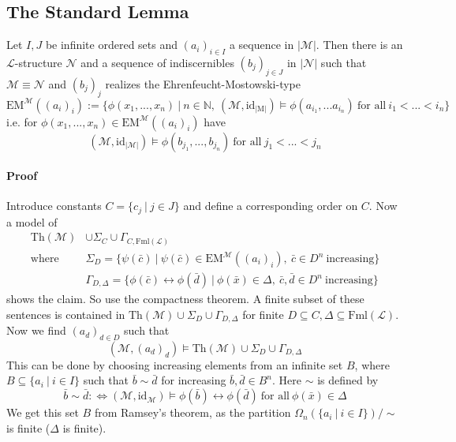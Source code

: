 \documentclass{scrartcl}
\newcommand{\N}{\mathbb{N}}
\begin{document}
\subsection{The Standard Lemma}
Let $I, J$ be infinite ordered sets and $(a_i)_{i \in I}$ a sequence in $|\mathcal{M}|$.
Then there is an $\mathcal{L}$-structure $\mathcal{N}$ and a sequence of indiscernibles $(b_j)_{j \in J}$ in $|\mathcal{N}|$ such that $\mathcal{M} \equiv \mathcal{N}$ and $(b_j)_j$ realizes the Ehrenfeucht-Mostowski-type
\begin{equation*}
    \mathrm{EM}^{\mathcal{M}}((a_i)_i) := \{ \phi(x_1, ..., x_n) \ | \ n \in \N, \ (\mathcal{M}, \mathrm{id}_{|\mathrm{M}|}) \models \phi(a_{i_1}, ... a_{i_n}) \ \text{for all} \ i_1 < ... < i_n \}
\end{equation*}
i.e. for $\phi(x_1, ..., x_n) \in \mathrm{EM}^{\mathcal{M}}((a_i)_i)$ have
\begin{equation*}
    (\mathcal{M}, \mathrm{id}_{|\mathcal{M}|}) \models \phi(b_{j_1}, ..., b_{j_n}) \ \text{for all} \ j_1 < ... < j_n
\end{equation*}
\paragraph{Proof} Introduce constants $C = \{ c_j \ | \ j \in J \}$ and define a corresponding order on $C$.
Now a model of
\begin{align*}
    \mathrm{Th}(\mathcal{M})& \cup \Sigma_C \cup \Gamma_{C, \mathrm{Fml}(\mathcal{L})} \\
    \text{where} \ &\Sigma_D = \{ \psi(\bar{c}) \ | \ \psi(\bar{c}) \in \mathrm{EM}^{\mathcal{M}}((a_i)_i), \ \bar{c} \in D^n \ \text{increasing} \} \\
    &\Gamma_{D, \Delta} = \{ \phi(\bar{c}) \leftrightarrow \phi(\bar{d}) \ | \ \phi(\bar{x}) \in \Delta, \ \bar{c}, \bar{d} \in D^n \ \text{increasing} \}
\end{align*}
shows the claim. So use the compactness theorem. 
A finite subset of these sentences is contained in $\mathrm{Th}(\mathcal{M}) \cup \Sigma_D \cup \Gamma_{D, \Delta}$ for finite $D \subseteq C, \Delta \subseteq \mathrm{Fml}(\mathcal{L})$.
Now we find $(a_d)_{d \in D}$ such that
\begin{equation*}
    (\mathcal{M}, (a_d)_d) \models \mathrm{Th}(\mathcal{M}) \cup \Sigma_D \cup \Gamma_{D, \Delta}
\end{equation*}
This can be done by choosing increasing elements from an infinite set $B$, where $B \subseteq \{ a_i \ | \ i \in I \}$ such that $\bar{b} \sim \bar{d}$ for increasing $\bar{b}, \bar{d} \in B^n$.
Here $\sim$ is defined by
\begin{equation*}
    \bar{b} \sim \bar{d} :\Leftrightarrow (\mathcal{M}, \mathrm{id}_{\mathcal{M}}) \models \phi(\bar{b}) \leftrightarrow \phi(\bar{d}) \ \text{for all} \ \phi(\bar{x}) \in \Delta
\end{equation*}
We get this set $B$ from Ramsey's theorem, as the partition $\Omega_n(\{ a_i \ | \ i \in I \})/\sim$ is finite ($\Delta$ is finite).
\end{document}
